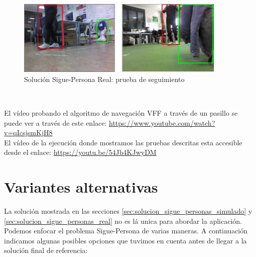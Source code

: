 \begin{itemize}
	\begin{figure} [H]
		\begin{center}
		\includegraphics[width=10cm]{imagenes/cap6/real-solucion-tracking-test.png}
		\end{center}
		\caption[Solución Sigue-Persona Real: prueba de seguimiento]{Solución Sigue-Persona Real: prueba de seguimiento}
		\label{fig:real_solucion_tracking_test}
	\end{figure}
\end{itemize}\

El vídeo probando el algoritmo de navegación VFF a través de un pasillo se puede ver a través de este enlace: \url{https://www.youtube.com/watch?v=qIcsjsmKjH8}\\

El vídeo de la ejecución donde mostramos las pruebas descritas esta accesible desde el enlace: \url{https://youtu.be/54Jb4KJwyDM}\\



\section{Variantes alternativas}
\label{sec:variantes_solucion}

La solución mostrada en las secciones \ref{sec:solucion_sigue_personas_simulado} y \ref{sec:solucion_sigue_personas_real} no es lá unica para abordar la aplicación. Podemos enfocar el problema Sigue-Persona de varias maneras. A continuación indicamos algunas posibles opciones que tuvimos en cuenta antes de llegar a la solución final de referencia:\\

